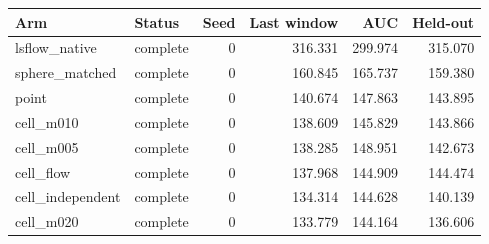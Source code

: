\begin{tabular}{llrrrr}
Arm & Status & Seed & Last window & AUC & Held-out \\
\hline
lsflow\_native & complete & 0 & 316.331 & 299.974 & 315.070 \\
sphere\_matched & complete & 0 & 160.845 & 165.737 & 159.380 \\
point & complete & 0 & 140.674 & 147.863 & 143.895 \\
cell\_m010 & complete & 0 & 138.609 & 145.829 & 143.866 \\
cell\_m005 & complete & 0 & 138.285 & 148.951 & 142.673 \\
cell\_flow & complete & 0 & 137.968 & 144.909 & 144.474 \\
cell\_independent & complete & 0 & 134.314 & 144.628 & 140.139 \\
cell\_m020 & complete & 0 & 133.779 & 144.164 & 136.606 \\
\end{tabular}

